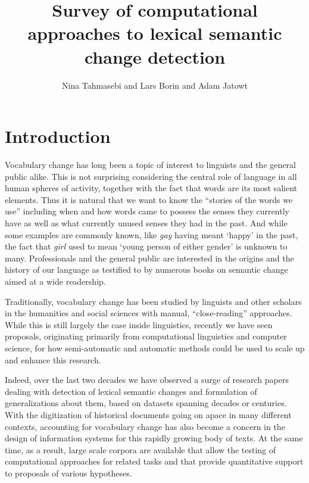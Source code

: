 \documentclass[output=paper]{langsci/langscibook}
\author{Nina Tahmasebi\affiliation{University of Gothenburg} and
Lars Borin\affiliation{University of Gothenburg} and
Adam Jatowt\affiliation{University of Innsbruck}}
\title[Lexical semantic change]
      {Survey of computational approaches to lexical semantic change detection}
\begin{document}
\maketitle

\section{Introduction}\label{sec:intro}

Vocabulary change has long been a topic of interest to linguists and the general public alike. This is not surprising  considering the central role of language in all human spheres of activity, together with the fact that words are its most salient elements. Thus it is natural that we want to know the ``stories of the words we use'' including when and how words came to possess the senses they currently have as well as what currently unused senses they had in the past. And while some examples are commonly known, like \textit{gay} having meant 
`happy' in the past, the fact that \textit{girl} used to mean `young person of either gender' is unknown to many. Professionals and the general public are interested in the origins and the history of our language as testified to by numerous books on semantic change aimed at a wide readership.

\begin{sloppypar}
Traditionally, vocabulary change has been studied by linguists and other scholars in the humanities and social sciences with manual, ``close-reading'' approaches. While this is still largely the case inside linguistics, recently we have seen proposals, originating primarily from computational linguistics and computer science, for how semi-automatic and automatic methods could be used to scale up and enhance this research.
\end{sloppypar}

Indeed, over the last two decades we have observed a surge of research papers dealing with detection of lexical semantic changes and formulation of generalizations about them, based on datasets spanning decades or centuries. With the digitization of historical documents going on apace in many different contexts, accounting for vocabulary change has also become a concern in the design of information systems for this rapidly growing body of texts. At the same time, as a result, large scale corpora are available that allow the testing of computational approaches for related tasks and that provide quantitative support to proposals of various hypotheses.\largerpage
\end{document}
